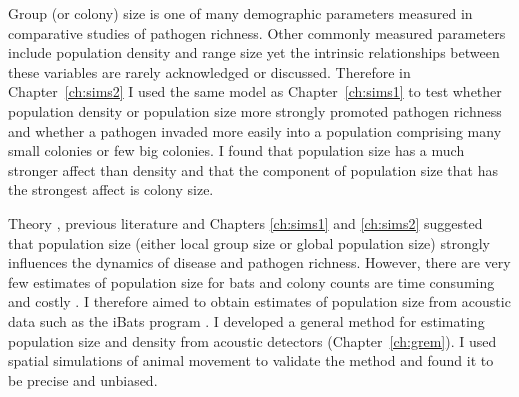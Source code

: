 
Group (or colony) size is one of many demographic parameters measured in comparative studies of pathogen richness.
Other commonly measured parameters include population density and range size \cite{kamiya2014determines, nunn2003comparative, morand1998density, lindenfors2007parasite, gay2014parasite, ezenwa2006host} yet the intrinsic relationships between these variables are rarely acknowledged or discussed.
Therefore in Chapter~\ref{ch:sims2} I used the same model as Chapter~\ref{ch:sims1} to test whether population density or population size more strongly promoted pathogen richness and whether a pathogen invaded more easily into a population comprising many small colonies or few big colonies.
I found that population size has a much stronger affect than density and that the component of population size that has the strongest affect is colony size.



Theory \cite{may1979population, anderson1979population}, previous literature \cite{kamiya2014determines, nunn2003comparative, morand1998density} and Chapters \ref{ch:sims1} and \ref{ch:sims2} suggested that population size (either local group size or global population size) strongly influences the dynamics of disease and pathogen richness.
However, there are very few estimates of population size for bats and colony counts are time consuming and costly \cite{kloepper2016estimating}.
I therefore aimed to obtain estimates of population size from acoustic data such as the iBats program \cite{jones2011indicator}.
I developed a general method for estimating population size and density from acoustic detectors (Chapter~\ref{ch:grem}).
I used spatial simulations of animal movement to validate the method and found it to be precise and unbiased.

